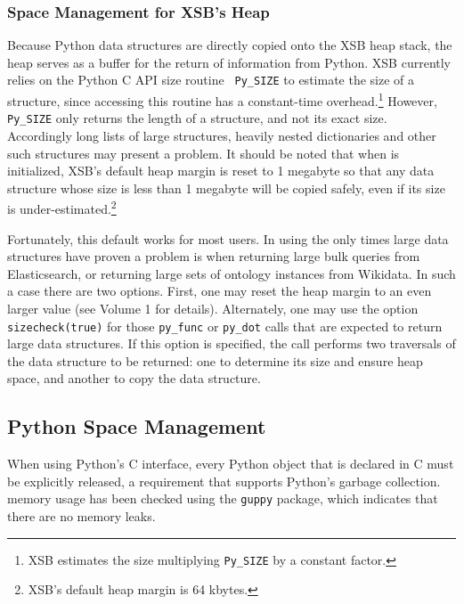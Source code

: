 \subsubsection{Space Management for XSB's Heap}
Because Python data structures are directly copied onto the XSB heap
stack, the heap serves as a buffer for the return of information from
Python.  XSB currently relies on the Python C API size routine {\tt
  Py\_SIZE} to estimate the size of a structure, since accessing this
routine has a constant-time overhead.\footnote{XSB estimates the size
  multiplying {\tt Py\_SIZE} by a constant factor.}  However, {\tt
  Py\_SIZE} only returns the length of a structure, and not its exact
size.  Accordingly long lists of large structures, heavily nested
dictionaries and other such structures may present a problem.  It
should be noted that when \janus{} is initialized, XSB's default
heap margin is reset to 1 megabyte so that any data structure whose
size is less than 1 megabyte will be copied safely, even if its size
is under-estimated.\footnote{XSB's default heap margin is 64 kbytes.}

Fortunately, this default works for most users.  In using \janus{}
the only times large data structures have proven a problem is when
returning large bulk queries from Elasticsearch, or returning large
sets of ontology instances from Wikidata.  In such a case there are
two options.  First, one may reset the heap margin to an even larger
value (see Volume 1 for details).  Alternately, one may use the option
{\tt sizecheck(true)} for those {\tt py\_func} or {\tt py\_dot} calls that
are expected to return large data structures.  If this option is
specified, the call performs two traversals of the data structure to
be returned: one to determine its size and ensure heap space, and another
to copy the data structure.

\subsection{Python Space Management}

When using Python's C interface, every Python object that is declared
in C must be explicitly released, a requirement that supports Python's
garbage collection.  \janus{} memory usage has been checked using
the {\tt guppy} package, which indicates that there are no memory
leaks.

%

